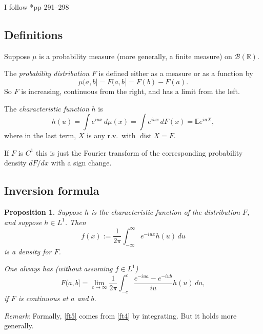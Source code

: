 \documentclass[a4paper]{amsart}
\theoremstyle{plain}
\newtheorem{proposition}[theorem]{Proposition}
\theoremstyle{definition}
\theoremstyle{remark}
\DeclareMathOperator{\dist}{dist}
\begin{document}
I follow \cite{Ash}*{pp 291--298}

\subsection{Definitions}
Suppose $ \mu $ is a probability measure (more generally, a finite measure)  on $ \mathcal{B}(\mathbb{R}) $.

The \emph{probability distribution} $ F $ is defined either as a measure or as a function by
 \[
\mu(a,b] = F(a,b] = F(b) - F(a).
\]
So $ F $ is increasing, continuous from the right, and has a limit from the left.

 
\medskip
The \emph{characteristic function} $ h  $ is
\begin{equation} \label{} 
h(u) = \int e^{iux}\,  d\mu (x)  = \int e^{iux} \, dF(x) = \mathbb{E} e^{iuX} ,
\end{equation} 
where in the last term, $ X $ is any r.v.\ with $ \dist X  = F $.

If $ F $ is $ C^1 $ this is just the Fourier transform of the corresponding probability density $ dF/dx$    with a sign change.


\subsection{Inversion formula}  
\begin{proposition}
Suppose $ h $ is the characteristic function of the distribution $ F $, and suppose $ h \in L^1 $.  Then
\begin{equation} \label{ft4}
f(x) := \frac{1}{2\pi} \int_{-\infty}^\infty e^{-iux} h(u)\, du
\end{equation}
is a density for $ F $.  

One \emph{always} has (without assuming $ f \in L^1$)
\begin{equation} \label{ft5}
F(a,b] = \lim_{c\to \infty} \frac{1}{2\pi} \int_{-c}^c \frac{e^{-iua} - e^{-iub}}{iu} h(u) \, du ,
\end{equation} 
if $ F $ is continuous at $ a $ and $ b $.
\end{proposition} 

\emph{Remark}: Formally, \eqref{ft5} comes from \eqref{ft4} by integrating.  But it holds more generally.
\end{document}
